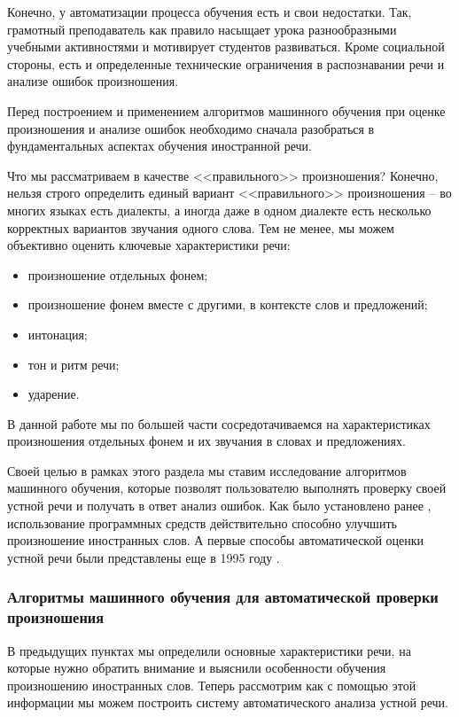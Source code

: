 Конечно, у автоматизации процесса обучения есть и свои недостатки. Так, грамотный преподаватель как правило насыщает урока разнообразными учебными активностями и мотивирует студентов развиваться. Кроме социальной стороны, есть и определенные технические ограничения в распознавании речи и анализе ошибок произношения.

Перед построением и применением алгоритмов машинного обучения при оценке произношения и анализе ошибок необходимо сначала разобраться в фундаментальных аспектах обучения иностранной речи.

Что мы рассматриваем в качестве <<правильного>> произношения? Конечно, нельзя строго определить единый вариант <<правильного>> произношения -- во многих языках есть диалекты, а иногда даже в одном диалекте есть несколько корректных вариантов звучания одного слова. Тем не менее, мы можем объективно оценить ключевые характеристики речи:
\begin{itemize}
	\item произношение отдельных фонем;
	\item произношение фонем вместе с другими, в контексте слов и предложений;
	\item интонация;
	\item тон и ритм речи;
	\item ударение.
\end{itemize}
В данной работе мы по большей части сосредотачиваемся на характеристиках произношения отдельных фонем и их звучания в словах и предложениях.

Своей целью в рамках этого раздела мы ставим исследование алгоритмов машинного обучения, которые позволят пользователю выполнять проверку своей устной речи и получать в ответ анализ ошибок. Как было установлено ранее \cite{rogers1994intelligibility}, использование программных средств действительно способно улучшить произношение иностранных слов. А первые способы автоматической оценки устной речи были представлены еще в 1995 году \cite{anderson1995evaluation}.

\subsubsection{Алгоритмы машинного обучения для автоматической проверки произношения}
В предыдущих пунктах мы определили основные характеристики речи, на которые нужно обратить внимание и выяснили особенности обучения произношению иностранных слов. Теперь рассмотрим как с помощью этой информации мы можем построить систему автоматического анализа устной речи.


